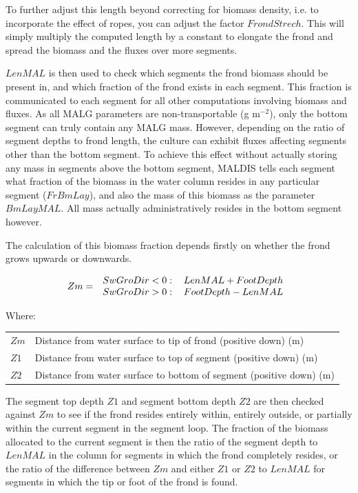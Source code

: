 \documentclass{deltares_manual}
\begin{document}
To further adjust this length beyond correcting for biomass density, i.e. to incorporate the effect of ropes,  you can adjust the factor $FrondStrech$. This will simply multiply the computed length by a constant to elongate the frond and spread the biomass and the fluxes over more segments.

$LenMAL$ is then used to check which segments the frond biomass should be present in, and which fraction of the frond exists in each segment. This fraction is communicated to each segment for all other computations involving biomass and fluxes. As all MALG parameters are non-transportable (g m$^{-2}$), only the bottom segment can truly contain any MALG mass. However, depending on the ratio of segment depths to frond length, the culture can exhibit fluxes affecting segments other than the bottom segment. To achieve this effect without actually storing any mass in segments above the bottom segment, MALDIS tells each segment what fraction of the biomass in the water column resides in any particular segment ($FrBmLay$), and also the mass of this biomass as the parameter $BmLayMAL$. All mass actually administratively resides in the bottom segment however.

The calculation of this biomass fraction depends firstly on whether the frond grows upwards or downwards.

\begin{equation}
Zm =  
\left 
.\begin{tabular}{cc}
$SwGroDir < 0:$& $LenMAL + FootDepth$\\
$SwGroDir > 0:$& $FootDepth - LenMAL$\\
\end{tabular}
\right
.\end{equation}

Where:\\

\begin{tabular}{ll}
$Zm$ & Distance from water surface to tip of frond (positive down) (m)\\
$Z1$ & Distance from water surface to top of segment (positive down) (m)\\
$Z2$ & Distance from water surface to bottom of segment (positive down) (m)\\
\end{tabular}

The segment top depth $Z1$ and segment bottom depth $Z2$ are then checked against $Zm$ to see if the frond resides entirely within, entirely outside, or partially within the current segment in the segment loop. The fraction of the biomass allocated to the current segment is then the ratio of the segment depth to $LenMAL$ in the column for segments in which the frond completely resides, or the ratio of the difference between $Zm$ and either $Z1$ or $Z2$ to $LenMAL$ for segments in which the tip or foot of the frond is found.
\end{document}
